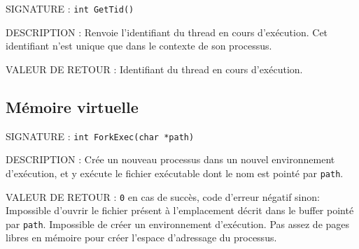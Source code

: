 \documentclass{article}
\begin{document}
		\vspace{2.5mm}
		\begin{description}
			\item{SIGNATURE : } \texttt{int GetTid()}
			\item{DESCRIPTION : Renvoie l'identifiant du thread en cours d'exécution. Cet identifiant n'est unique que dans le contexte de son processus.} 
			\item{VALEUR DE RETOUR : } Identifiant du thread en cours d'exécution.
		\end{description}
	\subsection{Mémoire virtuelle}
		\begin{description}
			\item{SIGNATURE : } \texttt{int ForkExec(char *path)}
			\item{DESCRIPTION : } Crée un nouveau processus dans un nouvel environnement d'exécution, et y exécute le fichier exécutable dont le nom est pointé par \texttt{path}.
			\item{VALEUR DE RETOUR : } \texttt{0} en cas de succès, code d'erreur négatif sinon:
				 Impossible d'ouvrir le fichier présent à l'emplacement décrit dans le buffer pointé par \texttt{path}.
				 Impossible de créer un environnement d'exécution.
				 Pas assez de pages libres en mémoire pour créer l'espace d'adressage du processus.
		\end{description}	
		
\end{document}
